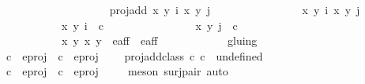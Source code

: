 \begin{isabellebody}
\ \ \ \ \ \ \ \ \ \ {\isacharbraceleft}\isanewline
\ \ \ \ \ \ \ \ \ \ \ \ proj{\isacharunderscore}add\ {\isacharparenleft}{\isacharparenleft}x{}{\isacharcomma}\ y{}{\isacharparenright}{\isacharcomma}\ i{\isacharparenright}\ {\isacharparenleft}{\isacharparenleft}x{}{\isacharcomma}\ y{}{\isacharparenright}{\isacharcomma}\ j{\isacharparenright}\ {\isacharbar}\ \isanewline
\ \ \ \ \ \ \ \ \ \ \ \ \ \ x{}\ y{}\ i\ x{}\ y{}\ j{\isachardot}\ \isanewline
\ \ \ \ \ \ \ \ \ \ \ \ \ \ {\isacharparenleft}{\isacharparenleft}x{}{\isacharcomma}\ y{}{\isacharparenright}{\isacharcomma}\ i{\isacharparenright}\ {\isasymin}\ c{}\ {\isasymand}\ \isanewline
\ \ \ \ \ \ \ \ \ \ \ \ \ \ {\isacharparenleft}{\isacharparenleft}x{}{\isacharcomma}\ y{}{\isacharparenright}{\isacharcomma}\ j{\isacharparenright}\ {\isasymin}\ c{}\ {\isasymand}\ \isanewline
\ \ \ \ \ \ \ \ \ \ \ \ \ \ {\isacharparenleft}{\isacharparenleft}x{}{\isacharcomma}\ y{}{\isacharparenright}{\isacharcomma}\ {\isacharparenleft}x{}{\isacharcomma}\ y{}{\isacharparenright}{\isacharparenright}\ {\isasymin}\ e{\isacharprime}{\isacharunderscore}aff{\isacharunderscore}{}\ {\isasymunion}\ e{\isacharprime}{\isacharunderscore}aff{\isacharunderscore}{}\isanewline
\ \ \ \ \ \ \ \ \ \ {\isacharbraceright}\ {\isacharslash}{\isacharslash}\ gluing\isanewline
\ \ \ \ \ \ \ \ {\isacharparenright}{\isachardoublequoteclose}\ \isanewline
\ \ \ \ {\isachardoublequoteopen}c{}\ {\isasymin}\ e{\isacharunderscore}proj{\isachardoublequoteclose}\ \ {\isachardoublequoteopen}c{}\ {\isasymin}\ e{\isacharunderscore}proj{\isachardoublequoteclose}\ \isanewline
\ \ {\isacharbar}\ {\isachardoublequoteopen}proj{\isacharunderscore}add{\isacharunderscore}class\ c{}\ c{}\ {\isacharequal}\ undefined{\isachardoublequoteclose}\ \isanewline
\ \ \ \ {\isachardoublequoteopen}c{}\ {\isasymnotin}\ e{\isacharunderscore}proj\ {\isasymor}\ c{}\ {\isasymnotin}\ e{\isacharunderscore}proj{\isachardoublequoteclose}\ \isanewline
%
\isadelimproof
\ \ %
\endisadelimproof
%
\isatagproof
{}\isamarkupfalse%
\ {\isacharparenleft}meson\ surj{\isacharunderscore}pair{\isacharparenright}\ auto%
\endisatagproof
{\isafoldproof}%
%
\isadelimproof
\isanewline
%
\endisadelimproof
\isanewline
{}\isamarkupfalse%

\end{isabellebody}
